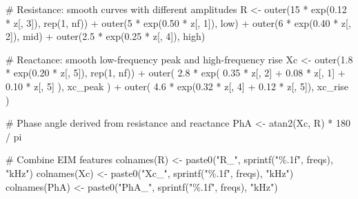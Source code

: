\documentclass[
  letterpaper,
  DIV=11,
  numbers=noendperiod]{scrreprt}
\newenvironment{Shaded}{\begin{snugshade}}{\end{snugshade}}
\newcommand{\CommentTok}[1]{\textcolor[rgb]{0.37,0.37,0.37}{#1}}
\newcommand{\DecValTok}[1]{\textcolor[rgb]{0.68,0.00,0.00}{#1}}
\newcommand{\FloatTok}[1]{\textcolor[rgb]{0.68,0.00,0.00}{#1}}
\newcommand{\FunctionTok}[1]{\textcolor[rgb]{0.28,0.35,0.67}{#1}}
\newcommand{\NormalTok}[1]{\textcolor[rgb]{0.00,0.23,0.31}{#1}}
\newcommand{\OtherTok}[1]{\textcolor[rgb]{0.00,0.23,0.31}{#1}}
\newcommand{\SpecialCharTok}[1]{\textcolor[rgb]{0.37,0.37,0.37}{#1}}
\newcommand{\StringTok}[1]{\textcolor[rgb]{0.13,0.47,0.30}{#1}}
\begin{document}
\begin{Shaded}
\begin{Highlighting}[]
\CommentTok{\# Resistance: smooth curves with different amplitudes}
\NormalTok{R }\OtherTok{\textless{}{-}} \FunctionTok{outer}\NormalTok{(}\DecValTok{15} \SpecialCharTok{*} \FunctionTok{exp}\NormalTok{(}\FloatTok{0.12} \SpecialCharTok{*}\NormalTok{ z[, }\DecValTok{3}\NormalTok{]), }\FunctionTok{rep}\NormalTok{(}\DecValTok{1}\NormalTok{, nf)) }\SpecialCharTok{+}
  \FunctionTok{outer}\NormalTok{(}\DecValTok{5} \SpecialCharTok{*} \FunctionTok{exp}\NormalTok{(}\FloatTok{0.50} \SpecialCharTok{*}\NormalTok{ z[, }\DecValTok{1}\NormalTok{]), low) }\SpecialCharTok{+}
  \FunctionTok{outer}\NormalTok{(}\DecValTok{6} \SpecialCharTok{*} \FunctionTok{exp}\NormalTok{(}\FloatTok{0.40} \SpecialCharTok{*}\NormalTok{ z[, }\DecValTok{2}\NormalTok{]), mid) }\SpecialCharTok{+}
  \FunctionTok{outer}\NormalTok{(}\FloatTok{2.5} \SpecialCharTok{*} \FunctionTok{exp}\NormalTok{(}\FloatTok{0.25} \SpecialCharTok{*}\NormalTok{ z[, }\DecValTok{4}\NormalTok{]), high)}

\CommentTok{\# Reactance: smooth low{-}frequency peak and high{-}frequency rise}
\NormalTok{Xc }\OtherTok{\textless{}{-}} \FunctionTok{outer}\NormalTok{(}\FloatTok{1.8} \SpecialCharTok{*} \FunctionTok{exp}\NormalTok{(}\FloatTok{0.20} \SpecialCharTok{*}\NormalTok{ z[, }\DecValTok{5}\NormalTok{]), }\FunctionTok{rep}\NormalTok{(}\DecValTok{1}\NormalTok{, nf)) }\SpecialCharTok{+}
  \FunctionTok{outer}\NormalTok{(}
    \FloatTok{2.8} \SpecialCharTok{*} \FunctionTok{exp}\NormalTok{(}
      \FloatTok{0.35} \SpecialCharTok{*}\NormalTok{ z[, }\DecValTok{2}\NormalTok{] }\SpecialCharTok{+} \FloatTok{0.08} \SpecialCharTok{*}\NormalTok{ z[, }\DecValTok{1}\NormalTok{] }\SpecialCharTok{+} \FloatTok{0.10} \SpecialCharTok{*}\NormalTok{ z[, }\DecValTok{5}\NormalTok{]}
\NormalTok{    ),}
\NormalTok{    xc\_peak}
\NormalTok{  ) }\SpecialCharTok{+}
  \FunctionTok{outer}\NormalTok{(}
    \FloatTok{4.6} \SpecialCharTok{*} \FunctionTok{exp}\NormalTok{(}\FloatTok{0.32} \SpecialCharTok{*}\NormalTok{ z[, }\DecValTok{4}\NormalTok{] }\SpecialCharTok{+} \FloatTok{0.12} \SpecialCharTok{*}\NormalTok{ z[, }\DecValTok{5}\NormalTok{]),}
\NormalTok{    xc\_rise}
\NormalTok{  )}

\CommentTok{\# Phase angle derived from resistance and reactance}
\NormalTok{PhA }\OtherTok{\textless{}{-}} \FunctionTok{atan2}\NormalTok{(Xc, R) }\SpecialCharTok{*} \DecValTok{180} \SpecialCharTok{/}\NormalTok{ pi}

\CommentTok{\# Combine EIM features}
\FunctionTok{colnames}\NormalTok{(R) }\OtherTok{\textless{}{-}} \FunctionTok{paste0}\NormalTok{(}\StringTok{"R\_"}\NormalTok{, }\FunctionTok{sprintf}\NormalTok{(}\StringTok{"\%.1f"}\NormalTok{, freqs), }\StringTok{"kHz"}\NormalTok{)}
\FunctionTok{colnames}\NormalTok{(Xc) }\OtherTok{\textless{}{-}} \FunctionTok{paste0}\NormalTok{(}\StringTok{"Xc\_"}\NormalTok{, }\FunctionTok{sprintf}\NormalTok{(}\StringTok{"\%.1f"}\NormalTok{, freqs), }\StringTok{"kHz"}\NormalTok{)}
\FunctionTok{colnames}\NormalTok{(PhA) }\OtherTok{\textless{}{-}} \FunctionTok{paste0}\NormalTok{(}\StringTok{"PhA\_"}\NormalTok{, }\FunctionTok{sprintf}\NormalTok{(}\StringTok{"\%.1f"}\NormalTok{, freqs), }\StringTok{"kHz"}\NormalTok{)}


\end{Highlighting}
\end{Shaded}
\end{document}
